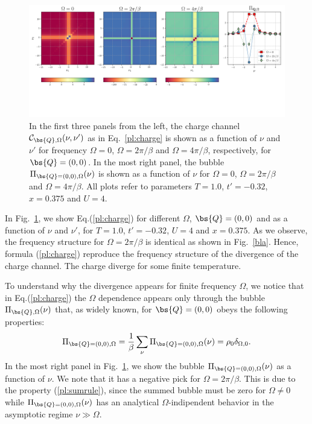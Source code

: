 \begin{figure}
\includegraphics[width=\textwidth]{images/PL_all.png}
\vspace*{-2.0cm}
\caption{In the first three panels from the left, the charge channel $\mathcal{C}_{\bs{Q},\Omega} (\nu,\nu')$ as in Eq.~\ref{pl:charge} is shown as 
a function of $\nu$ and $\nu'$ for frequency $\Omega=0$, $\Omega=2\pi/ \beta$ and 
$\Omega=4\pi/ \beta$, respectively, for $\bs{Q}=(0,0)$. In the most right panel, the bubble $\Pi_{\bs{Q}=(0,0),\Omega}(\nu)$ is shown as a function of $\nu$ for 
$\Omega=0$, $\Omega=2\pi/ \beta$ and $\Omega=4\pi/ \beta$. All plots refer to parameters $T=1.0$, $t'=-0.32$, $x=0.375$ and $U=4$.  } 
\label{fig:perpladder}
\end{figure}

In Fig.~\ref{fig:perpladder}, we show Eq.(\ref{pl:charge}) for different $\Omega$, $\bs{Q}=(0,0)$ and as a function of $\nu$ and $\nu'$, 
for $T=1.0$, $t'=-0.32$, $U=4$ and $x=0.375$. 
As we observe, the frequency structure for $\Omega=2\pi/ \beta$ is identical as shown in Fig.~\ref{bla}. Hence, formula (\ref{pl:charge}) 
reproduce the frequency structure of the divergence of the charge channel. The charge diverge for some finite temperature.

To understand why the divergence appears for finite frequency $\Omega$, we notice that in Eq.(\ref{pl:charge}) the $\Omega$ dependence 
appears only through the bubble $\Pi_{\bs{Q},\Omega}(\nu)$ that, as widely known, for $\bs{Q}=(0,0)$ obeys 
the following properties:
\begin{equation}
	\Pi_{\bs{Q}=(0,0),\Omega} = \frac{1}{\beta} \sum_{\nu} \Pi_{\bs{Q}=(0,0),\Omega}(\nu) = \rho_{0} \delta_{\Omega,0}.
\label{pl:sumrule}
\end{equation}
In the most right panel in Fig.~\ref{fig:perpladder}, we show the bubble $\Pi_{\bs{Q}=(0,0),\Omega}(\nu)$ as a function of $\nu$.
We note that it has a negative pick for $\Omega=2\pi/ \beta$. This is due to the property (\ref{pl:sumrule}), since the summed 
bubble must be zero for $\Omega \neq 0$ while $\Pi_{\bs{Q}=(0,0),\Omega}(\nu)$ has an analytical $\Omega$-indipendent behavior 
in the asymptotic regime $\nu \gg \Omega$.


